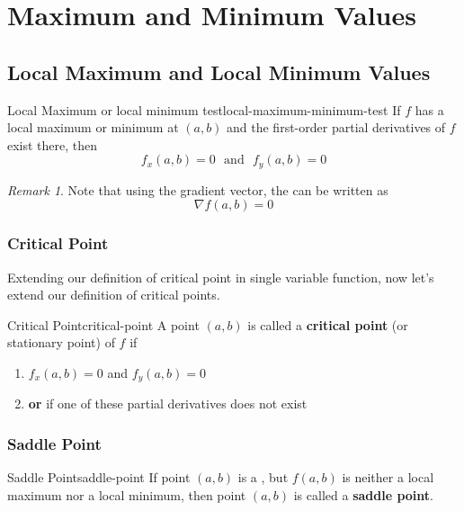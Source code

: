\documentclass[math,code]{amznotes}
\theoremstyle{remark}
\newtheorem*{remark}{Remark}
\begin{document}
\section{Maximum and Minimum Values}
\subsection{Local Maximum and Local Minimum Values}
\begin{thmbox}{Local Maximum or local minimum test}{local-maximum-minimum-test}
    If $f$ has a local maximum or minimum at $(a,b)$ and the first-order partial derivatives of $f$ exist there, then
    \begin{displaymath}
        f_x(a,b)=0 ~~~\text{and}~~~ f_y(a,b)=0
    \end{displaymath}
\end{thmbox}
\begin{notebox}
    \begin{remark}
        Note that using the gradient vector, the  can be written as
        \begin{displaymath}
            \nabla f(a,b)=0
        \end{displaymath}
    \end{remark}
\end{notebox}
\subsubsection{Critical Point}
Extending our definition of critical point in single variable function, now let's extend our definition of critical points.
\begin{dfnbox}{Critical Point}{critical-point}
    A point $(a,b)$ is called a {\color{red} \textbf{critical point}} (or stationary point) of $f$ if
    \begin{enumerate}
        \item $f_x(a,b)=0$ and $f_y(a,b)=0$
        \item {\color{red} \textbf{or}} if one of these partial derivatives does not exist
    \end{enumerate}
\end{dfnbox}
\subsubsection{Saddle Point}
\begin{dfnbox}{Saddle Point}{saddle-point}
    If point $(a,b)$ is a , but $f(a,b)$ is neither a local maximum nor a local minimum, then point $(a,b)$ is called a {\color{red} \textbf{saddle point}}.
\end{dfnbox}
\end{document}

